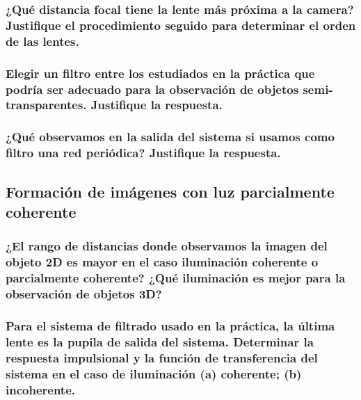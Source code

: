 \documentclass{./packages/optica-article}
\begin{document}
\subsubsection{¿Qué distancia focal tiene la lente más próxima a la camera? Justifique el procedimiento seguido para determinar el orden de las lentes.}
\subsubsection{Elegir un filtro entre los estudiados en la práctica que podría ser adecuado para la observación de objetos semi-transparentes. Justifique la respuesta.}
\subsubsection{¿Qué observamos en la salida del sistema si usamos como filtro una red periódica? Justifique la respuesta.}

\subsection{Formación de imágenes con luz parcialmente coherente}

\subsubsection{¿El rango de distancias donde observamos la imagen del objeto 2D es mayor en el caso iluminación coherente o parcialmente coherente? ¿Qué iluminación es mejor para la observación de objetos 3D?}

\subsubsection{Para el sistema de filtrado usado en la práctica, la última lente es la pupila de salida del sistema. Determinar la respuesta impulsional y la función de transferencia del sistema en el caso de iluminación (a) coherente; (b) incoherente.}

\end{document}
